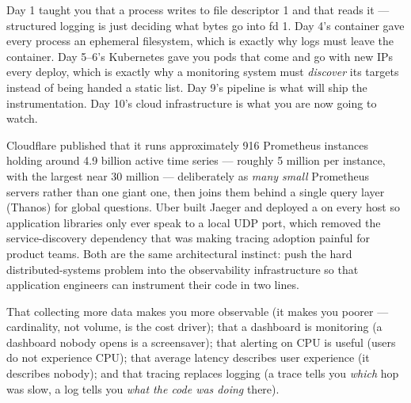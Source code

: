  Day 1 taught you that a process writes to file descriptor 1 and that  reads it --- structured logging is just deciding what bytes go into fd 1. Day 4's container gave every process an ephemeral filesystem, which is exactly why logs must leave the container. Day 5--6's Kubernetes gave you pods that come and go with new IPs every deploy, which is exactly why a monitoring system must \emph{discover} its targets instead of being handed a static list. Day 9's pipeline is what will ship the instrumentation. Day 10's cloud infrastructure is what you are now going to watch.

 Cloudflare published that it runs approximately 916 Prometheus instances holding around 4.9 billion active time series --- roughly 5 million per instance, with the largest near 30 million --- deliberately as \emph{many small} Prometheus servers rather than one giant one, then joins them behind a single query layer (Thanos) for global questions. Uber built Jaeger and deployed a  on every host so application libraries only ever speak to a local UDP port, which removed the service-discovery dependency that was making tracing adoption painful for product teams. Both are the same architectural instinct: push the hard distributed-systems problem into the observability infrastructure so that application engineers can instrument their code in two lines.

 That collecting more data makes you more observable (it makes you poorer --- cardinality, not volume, is the cost driver); that a dashboard is monitoring (a dashboard nobody opens is a screensaver); that alerting on CPU is useful (users do not experience CPU); that average latency describes user experience (it describes nobody); and that tracing replaces logging (a trace tells you \emph{which} hop was slow, a log tells you \emph{what the code was doing} there).


